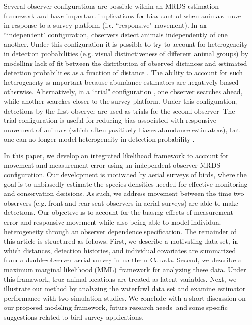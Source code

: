 \documentclass[aoas,preprint]{imsart}
\numberwithin{equation}{section}
\theoremstyle{plain}
\begin{document}
Several observer configurations are possible within an MRDS estimation framework \citep{BurtEtAl2014} and have important implications for bias control when animals move in response to a survey platform (i.e. ``responsive" movement).  In an ``independent" configuration, observers detect animals independently of one another.  Under this configuration it is possible to try to account for heterogeneity in detection probabilities (e.g. visual distinctiveness of different animal groups) by modelling lack of fit between the distribution of observed distances and estimated detection probabilities as a function of distance \citep{LaakeBorchers2004,BorchersEtAl2006,BucklandEtAl2010}.  The ability to account for such heterogeneity is important because abundance estimators are negatively biased otherwise. Alternatively, in a ``trial" configuration \citep{BucklandTurnock1992}, one observer searches ahead, while another searches closer to the survey platform.  Under this configuration, detections by the first observer are used as trials for the second observer.  The trial configuration is useful for reducing bias associated with responsive movement of animals (which often positively biases abundance estimators), but one can no longer model heterogeneity in detection probability \citep{BurtEtAl2014}.

In this paper, we develop an integrated likelihood framework to account for movement and measurement error using an independent observer MRDS configuration. Our development is motivated by aerial surveys of birds, where the goal is to unbiasedly estimate the species densities needed for effective monitoring and conservation decisions. As such, we address movement between the time two observers (e.g. front and rear seat observers in aerial surveys) are able to make detections.  Our objective is to account for the biasing effects of measurement error and responsive movement while also being able to model individual heterogeneity through an observer dependence specification.  The remainder of this article is structured as follows.  First, we describe a motivating data set, in which distances, detection histories, and individual covariates are summarized from a double-observer aerial survey in northern Canada.  Second, we describe a maximum marginal likelihood (MML) framework for analyzing these data.  Under this framework, true animal locations are treated as latent variables.  Next, we illustrate our method by analyzing the waterfowl data set and examine estimator performance with two simulation studies.  We conclude with a short discussion on our proposed modeling framework, future research needs, and some specific suggestions related to bird survey applications.
\end{document}
